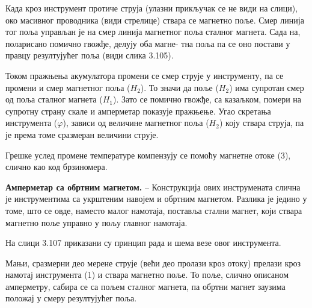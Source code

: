 \documentclass[12pt,a4paper]{report}
\begin{document}
Када кроз инструмент протиче струја (улазни прикључак се не види на слици), око масивног проводника (види стрелице) ствара се магнетно поље. Смер линија тог поља управљан је на смер линија магнетног поља сталног магнета. Сада на, поларисано помично гвожђе, делују оба магне-%
тна поља па се оно постави у правцу резултујућег поља (види слика 3.105).

Током пражњења акумулатора промени се смер струје у инструменту, па се промени и смер магнетног поља ($H_2$). То значи да поље ($H_2$) има супротан смер од поља сталног магнета ($H_1$). Зато се помично гвожђе, са казаљком, помери на супротну страну скале и амперметар показује пражњење. Угао скретања инструмента ($\varphi$), зависи од величине магнетног поља ($H_2$) коју ствара струја, па је према томе сразмеран величини струје.

Грешке услед промене температуре компензују се помоћу магнетне отоке (3), слично као код брзиномера.

\textbf{Амперметар са обртним магнетом.} – Конструкција ових инструмената слична је инструментима са укрштеним навојем и обртним магнетом. Разлика је једино у томе, што се овде, наместо малог намотаја, поставља стални магнет, који ствара магнетно поље управно у пољу главног намотаја.

На слици 3.107 приказани су принцип рада и шема везе овог инструмента.


Мањи, сразмерни део мерене струје (већи део пролази кроз отоку) прелази кроз намотај инструмента (1) и ствара магнетно поље. То поље, слично описаном амперметру, сабира се са пољем сталног магнета, па обртни магнет заузима положај у смеру резултујућег поља.
\end{document}
